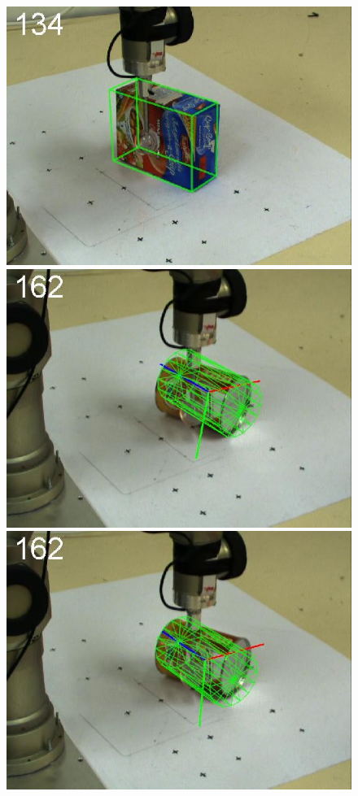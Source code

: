 \begin{figure}[htbp]
{\includegraphics[width=\imgAXwid]{images/A2_2exp_87_3}
\includegraphics[width=\imgAXwid]{images/A3_2exp_39_3}
\includegraphics[width=\imgAXwid]{images/A3_LWPR1_39_3}
}
\end{figure}

